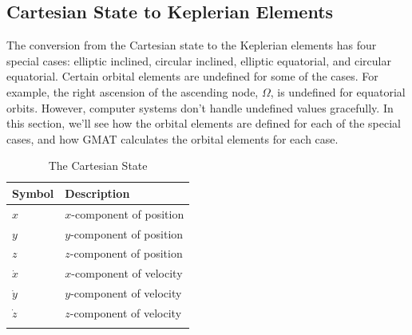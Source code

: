 %

\subsection{Cartesian State to Keplerian Elements}\label{Sec:Cart2Kep}   

The conversion from the Cartesian state to the Keplerian elements
has four special cases:  elliptic inclined, circular inclined,
elliptic equatorial, and circular equatorial.  Certain orbital
elements are undefined for some of the cases.  For example, the
right ascension of the ascending node, $\Omega$, is undefined for
equatorial orbits.  However, computer systems don't handle undefined
values gracefully.  In this section, we'll see how the orbital
elements are defined for each of the special cases, and how GMAT
calculates the orbital elements for each case\cite{Vallado:02}.

%
\begin{table} \caption{The Cartesian State}
\centering {}
\begin{tabular}{p{.5 in} p{2.0 in}}
  \hline\hline
   Symbol &  Description \\
  \hline
  $x$ &  $x$-component of position\\
%
  $y$ &  $y$-component of position \\
  $z$ &  $z$-component of position \\
  $\dot{x}$ &  $x$-component of velocity\\
  $\dot{y}$ & $y$-component of velocity\\
  $\dot{z}$ & $z$-component of velocity \\
  \hline\hline \label{Table:CartesianStates}
\end{tabular}
\end{table}

